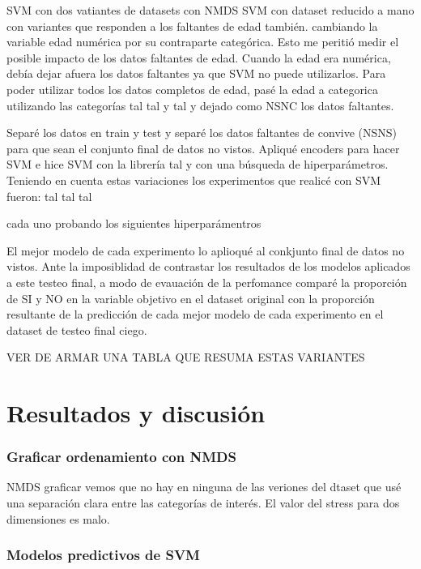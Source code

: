\documentclass[10 pt]{article}
\begin{document}
SVM con dos vatiantes de datasets con NMDS
SVM con dataset reducido a mano con variantes que responden a los faltantes de edad también. cambiando la variable edad numérica por su contraparte categórica. Esto me peritió medir el posible impacto de los datos faltantes de edad. Cuando la edad era numérica, debía dejar afuera los datos faltantes ya que SVM no puede utilizarlos. Para poder utilizar todos los datos completos de edad, pasé la edad a categorica  utilizando las categorías tal tal y tal y dejado como NSNC los datos faltantes.

Separé los datos en train y test y separé los datos faltantes de convive (NSNS) para que sean el conjunto final de datos no vistos.  
Apliqué encoders para hacer SVM e hice SVM con la librería tal y con una búsqueda de hiperparámetros.  Teniendo en cuenta estas variaciones los experimentos que realicé con SVM fueron: 
tal tal tal

cada uno probando los siguientes hiperparámentros

El mejor modelo de cada experimento lo aplioqué al conkjunto final de datos no vistos. Ante la imposiblidad de contrastar los resultados de los modelos aplicados a este testeo final, a modo de evauación de la perfomance comparé la proporción de SI y NO en la variable objetivo en el dataset original con la proporción resultante de la predicción de cada mejor modelo de cada experimento en el dataset de testeo final ciego.

VER DE ARMAR UNA TABLA QUE RESUMA ESTAS VARIANTES 


\section{Resultados y discusión}\label{resultados}

\subsubsection{Graficar ordenamiento con NMDS}

NMDS graficar vemos que no hay en ninguna de las veriones del dtaset que usé una separación clara entre las categorías de interés. El valor del stress para dos dimensiones es malo.




\subsubsection{Modelos predictivos de SVM}
\end{document}
